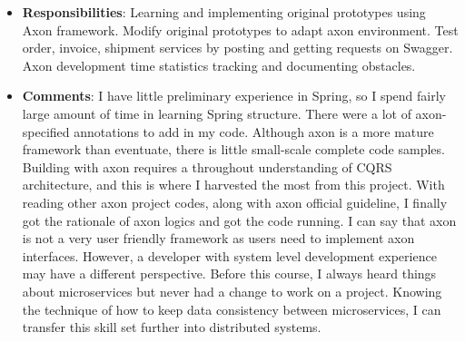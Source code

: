 \begin{itemize}
    \item \textbf{Responsibilities}: Learning and implementing original prototypes using Axon framework. Modify original prototypes to adapt axon environment. Test order, invoice, shipment services by posting and getting requests on Swagger. Axon development time statistics tracking and documenting obstacles.
    \item \textbf{Comments}: I have little preliminary experience in Spring, so I spend fairly large amount of time in learning Spring structure. There were a lot of axon-specified annotations to add in my code. Although axon is a more mature framework than eventuate, there is little small-scale complete code samples. Building with axon requires a throughout understanding of CQRS architecture, and this is where I harvested the most from this project. With reading other axon project codes, along with axon official guideline, I finally got the rationale of axon logics and got the code running. I can say that axon is not a very user friendly framework as users need to implement axon interfaces. However, a developer with system level development experience may have a different perspective. Before this course, I always heard things about microservices but never had a change to work on a project. Knowing the technique of how to keep data consistency between microservices, I can transfer this skill set further into distributed systems.
\end{itemize}
